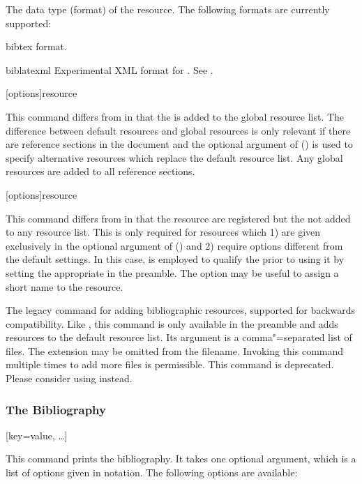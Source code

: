 \documentclass{ltxdockit}[2011/03/25]
\newcommand*{\biblatex}{\sty{biblatex}\xspace}
\begin{document}
\begin{ltxsyntax}
\begin{optionlist*}
The data type (format) of the resource. The following formats are currently supported:

\begin{valuelist}

\item[bibtex] \bibtex format.

\item[biblatexml]  Experimental XML format for \biblatex. See .

\end{valuelist}

\end{optionlist*}

[options]{resource}

This command differs from  in that the  is added to the global resource list. The difference between default resources and global resources is only relevant if there are reference sections in the document and the optional argument of  () is used to specify alternative resources which replace the default resource list. Any global resources are added to all reference sections.

[options]{resource}

This command differs from  in that the resource  are registered but the  not added to any resource list. This is only required for resources which 1) are given exclusively in the optional argument of  () and 2) require options different from the default settings. In this case,  is employed to qualify the  prior to using it by setting the appropriate  in the preamble. The  option may be useful to assign a short name to the resource.

\DeprecatedMark

The legacy command for adding bibliographic resources, supported for backwards compatibility. Like , this command is only available in the preamble and adds resources to the default resource list. Its argument is a comma"=separated list of  files. The  extension may be omitted from the filename. Invoking this command multiple times to add more files is permissible. This command is deprecated. Please consider using  instead.

\subsubsection{The Bibliography}
\label{use:bib:bib}

[key=value, \dots]

This command prints the bibliography. It takes one optional argument, which is a list of options given in \keyval notation. The following options are available:

\end{ltxsyntax}
\end{document}
